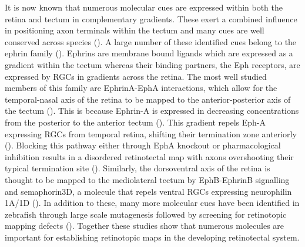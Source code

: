 It is now known that numerous molecular cues are expressed within both the retina and tectum in complementary gradients. These exert a combined influence in positioning axon terminals within the tectum and many cues are well conserved across species (\cite{McLaughlin2003RetinotopicDevelopment, Feldheim2010VisualCompetition., Higenell2012ExpressionLaevis}). A large number of these identified cues belong to the ephrin family (\cite{Egea2007BidirectionalGuidance, Drescher1997TheGuidance}). Ephrins are membrane bound ligands which are expressed as a gradient within the tectum whereas their binding partners, the Eph receptors, are expressed by RGCs in gradients across the retina. The most well studied members of this family are EphrinA-EphA interactions, which allow for the temporal-nasal axis of the retina to be mapped to the anterior-posterior axis of the tectum (\cite{Triplett2012EphMaps}). This is because Ephrin-A is expressed in decreasing concentrations from the posterior to the anterior tectum (\cite{Drescher1995InKinases, Brennan1997TwoZebrafish, Higenell2012ExpressionLaevis, McLaughlin2003RetinotopicDevelopment}). This gradient repels Eph-A expressing RGCs from temporal retina, shifting their termination zone anteriorly (\cite{Drescher1997TheGuidance}). Blocking this pathway either through EphA knockout or pharmacological inhibition results in a disordered retinotectal map with axons overshooting their typical termination site (\cite{Woo2009RetinotopicAdhesion, Sweeney2015Ephrin-asTypes}). Similarly, the dorsoventral axis of the retina is thought to be mapped to the mediolateral tectum by EphB-EphrinB signalling and semaphorin3D, a molecule that repels ventral RGCs expressing neurophilin 1A/1D (\cite{Hindges2002EphBMapping., Brennan1997TwoZebrafish, Liu2012}). In addition to these, many more molecular cues have been identified in zebrafish through large scale mutagenesis followed by screening for retinotopic mapping defects (\cite{Baier1996GeneticProjection, Karlstrom1996ZebrafishPathfinding}). Together these studies show that numerous molecules are important for establishing retinotopic maps in the developing retinotectal system.

